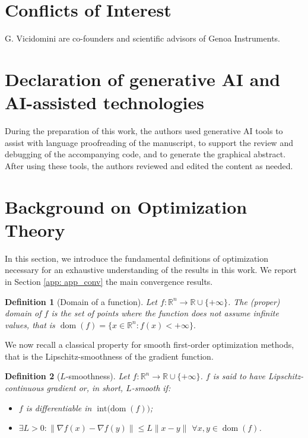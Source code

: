 \documentclass[letterpaper]{article}
\newtheorem{definition}{Definition}
\begin{document}
\section*{Conflicts of Interest}

G. Vicidomini are co-founders and scientific advisors of Genoa Instruments. 

\section*{Declaration of generative AI and AI-assisted technologies}

During the preparation of this work, the authors used generative AI tools to assist with language proofreading of the manuscript, to support the review and debugging of the accompanying code, and to generate the graphical abstract. After using these tools, the authors reviewed and edited the content as needed.

\clearpage

\appendix




\section{Background on Optimization Theory}

In this section, we introduce the fundamental definitions of optimization necessary for an exhaustive understanding of the results in this work.  We report  in Section \ref{app: app_conv} the main convergence results.

\begin{definition}[Domain of a function] \label{def: dom}
    Let $f:\mathbb{R}^n \to \mathbb{R} \cup \{+\infty\}$. The (proper) domain of $f$ is the set of points where the function does not assume infinite values, that is
    $\operatorname{dom}(f)=\{x \in \mathbb{R}^n : f(x) < +\infty\}.$
\end{definition}

We now recall a classical property for smooth first-order optimization methods, that is the Lipschitz-smoothness of the gradient function.

\begin{definition}[$L$-smoothness]\label{L-smothness}
    Let $f:\mathbb{R}^n \to \mathbb{R} \cup \{+\infty\}$. $f$ is said to have Lipschitz-continuous gradient or, in short, $L$-smooth if:
    \begin{itemize}
        \item $f$ is differentiable in $\operatorname{int(dom}(f))$;
        \item $\exists L>0 : \|\nabla f(x)-\nabla f (y)\| \leq L\|x-y\|$ $\forall x,y \in \operatorname{dom}(f)$. 
    \end{itemize}
\end{definition}
\end{document}
